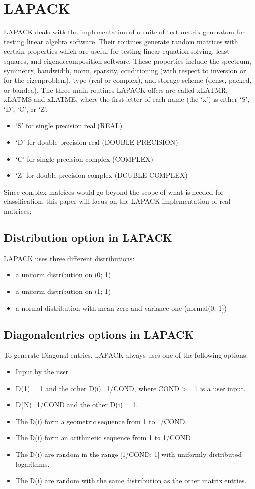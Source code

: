 \documentclass[parskip=full]{scrartcl}
\begin{document}
\section{LAPACK}
LAPACK deals with the implementation of a suite of test matrix generators for testing linear algebra software. Their routines generate random matrices with certain properties which are useful for testing linear equation solving, least squares, and eigendecomposition software. These properties include the spectrum, symmetry, bandwidth, norm, sparsity, conditioning  (with respect to inversion or for the eigenproblem), type (real or complex), and storage scheme (dense, packed, or banded).
The three main routines LAPACK offers are called xLATMR, xLATMS and xLATME, where the first letter of each name (the `x') is either `S', `D', `C', or `Z'. 
\begin{itemize}
\item ‘S’ for single precision real (REAL)
\item ‘D’ for double precision real (DOUBLE PRECISION)
\item ‘C’ for single precision complex (COMPLEX)
\item ‘Z’ for double precision complex (DOUBLE COMPLEX)
\end{itemize}
Since complex matrices would go beyond the scope of what is needed for classification, this paper will focus on the LAPACK implementation of real matrices:

\newpage
\subsection{Distribution option in LAPACK}
LAPACK uses three different distributions:
\begin{itemize}
\item a uniform distribution on (0; 1)
\item a uniform distribution on (1; 1)
\item a normal distribution with mean zero and variance one (normal(0; 1))
\end{itemize}

\subsection{Diagonalentries options in LAPACK}
To generate Diagonal entries, LAPACK always uses one of the following options:
\begin{itemize}
	\item Input by the user.
	\item D(1) = 1 and the other D(i)=1/COND, where COND >= 1 is a user input.
	\item D(N)=1/COND and the other D(i) = 1. 
	\item The D(i) form a geometric sequence from 1 to 1/COND. 
	\item The D(i) form an arithmetic sequence from 1 to 1/COND
	\item The D(i) are random in the range [1/COND; 1] with uniformly distributed logarithms. 
	\item The D(i) are random with the same distribution as the other matrix entries.
\end{itemize}
\end{document}
